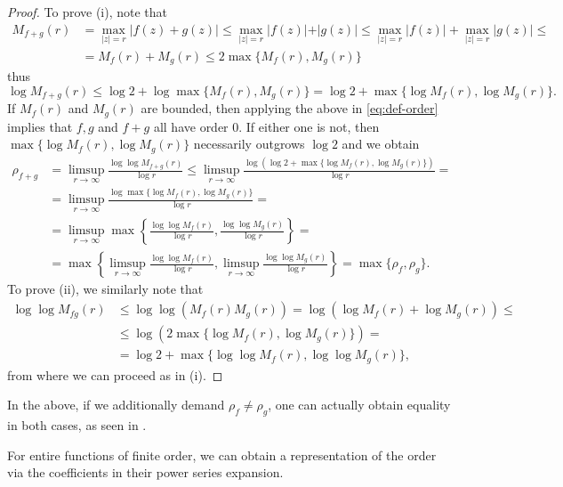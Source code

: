 \begin{proof}
    To prove (i), note that
    \begin{align*}
        M_{f+g}(r) &= \max_{\vert z \vert = r} \vert f(z) + g(z) \vert \leq \max_{\vert z \vert = r} \vert f(z) \vert + \vert g(z) \vert \leq \max_{\vert z \vert = r} \vert f(z) \vert + \max_{\vert z \vert = r} \vert g(z) \vert \leq \\
        &= M_f(r) + M_g(r) \leq 2 \max \{ M_f(r), M_g(r) \}
    \end{align*}
    thus
    $$ \log M_{f+g}(r) \leq \log 2 + \log \max \{ M_f(r), M_g(r) \} = \log 2 + \max \{ \log M_f(r), \log M_g(r) \}. $$
    If $M_f(r)$ and $M_g(r)$ are bounded, then applying the above in \cref{eq:def-order} implies that $f, g$ and $f+g$ all have order $0$. If either one is not, then $\max \{ \log M_f(r), \log M_g(r) \}$ necessarily outgrows $\log 2$ and we obtain
    \begin{align*}
        \rho_{f+g} &= \limsup_{r \to \infty} \frac{\log \log M_{f+g}(r)}{\log r} \leq \limsup_{r \to \infty} \frac{\log (\log 2 + \max \{ \log M_f(r), \log M_g(r) \})}{\log r} = \\
        &= \limsup_{r \to \infty} \frac{\log \max \{ \log M_f(r), \log M_g(r) \}}{\log r} = \\
        &= \limsup_{r \to \infty} \max \left\{ \frac{\log \log M_f(r)}{\log r}, \frac{\log \log M_g(r)}{\log r} \right\} = \\
        &= \max \left\{ \limsup_{r \to \infty} \frac{\log \log M_f(r)}{\log r}, \limsup_{r \to \infty} \frac{\log \log M_g(r)}{\log r} \right\} = \max \{ \rho_f, \rho_g \}.
    \end{align*}
    To prove (ii), we similarly note that
    \begin{align*}
        \log \log M_{fg}(r) &\leq \log \log ( M_f(r) M_g(r) ) = \log (\log M_f(r) + \log M_g(r)) \leq \\
        &\leq \log (2 \max \{ \log M_f(r), \log M_g(r) \}) = \\
        &= \log 2 + \max \{ \log \log M_f(r), \log \log M_g(r) \},
    \end{align*}
    from where we can proceed as in (i).
\end{proof}

In the above, if we additionally demand $\rho_f \neq \rho_g$, one can actually obtain equality in both cases, as seen in .

For entire functions of finite order, we can obtain a representation of the order via the coefficients in their power series expansion.

